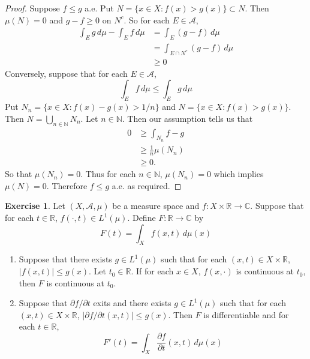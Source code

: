 \documentclass{book}
\theoremstyle{definition}
\newtheorem{ex}[definition]{Exercise}
\newcommand{\C}{\mathbb{C}}
\newcommand{\N}{\mathbb{N}}
\newcommand{\R}{\mathbb{R}}
\newcommand{\MA}{\mathcal{A}}
\newcommand{\lex}[1]{\label{ex:#1}}
\DeclareMathOperator*{\0}{\mbf{0}}
\DeclareMathOperator*{\1}{\mbf{1}}
\newcommand{\p}{\partial}
\newcommand{\dmu}{\, d \mu}
\begin{document}
	\begin{proof}
		Suppose $f \leq g$ a.e. Put $N = \{x\in X: f(x) > g(x)\} \subset N$. Then $\mu(N) = 0$ and $g-f \geq 0$ on $N^c$. So for each $E \in \MA$,
		\begin{align*}
			\int_E g \dmu - \int_E f \dmu 
			&= \int_E (g-f) \dmu\\
			&= \int_{E \cap N^c} (g-f) \dmu\\
			& \geq 0
		\end{align*} 
		Conversely, suppose that for each $E \in \MA$, 
		$$\int_E f\dmu \leq \int_E g \dmu$$ 
		Put $N_n = \{x \in X: f(x) - g(x) > 1/n\}$ and $N = \{x \in X: f(x) > g(x)\}$. Then $N = \bigcup\limits_{n \in \N}N_n$. Let $n \in \N$. Then our assumption tells us that 
		\begin{align*}
			0 
			&\geq \int_{N_n} f-g\\
			& \geq \frac{1}{n} \mu(N_n)\\
			& \geq 0.
		\end{align*} 
		So that $\mu(N_n) = 0$. Thus for each $n \in \N$, $\mu(N_n) = 0$ which implies $\mu(N) = 0$. Therefore $f \leq g$ a.e. as required. 
	\end{proof}
	
	\begin{ex} \lex{00000} 
	Let $(X, \MA, \mu)$ be a measure space and $f:X \times \R \rightarrow \C$. Suppose that for each $t \in \R$, $f(\cdot, t) \in L^1(\mu)$. Define $F: \R \rightarrow \C$ by 
	$$F(t) = \int_X f(x, t) \dmu(x)$$ 
	\begin{enumerate}
	\item Suppose that there exists $g \in L^1(\mu)$ such that for each $(x, t) \in X \times \R$, $|f(x,t)| \leq g(x)$. Let $t_0 \in \R$. If for each $x \in X$, $f(x, \cdot)$ is continuous at $t_0$, then $F$ is continuous at $t_0$. 
 	\item Suppose that $\p f / \p t$ exits and there exists $g \in L^1(\mu)$ such that for each $(x, t) \in X \times \R$, $|\p f / \p t(x,t) | \leq g(x)$. Then $F$ is differentiable and for each $t \in \R$, $$F'(t) = \int_X \frac{\p f}{\p t}(x, t) \dmu(x)$$
	\end{enumerate}
	\end{ex}
	
\end{document}
